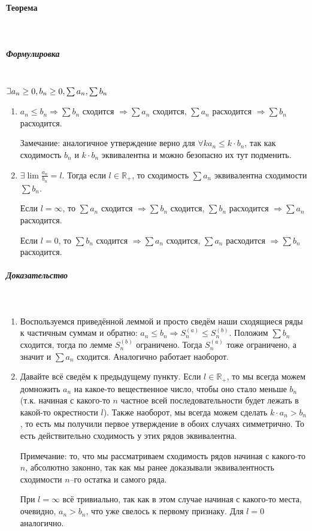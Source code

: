\documentclass{article}
\def\letus{%
\mathord{\setbox0=\hbox{$\exists$}%
         \hbox{\kern 0.125\wd0%
               \vbox to \ht0{%
                  \hrule width 0.75\wd0%
                  \vfill%
                  \hrule width 0.75\wd0}%
               \vrule height \ht0%
               \kern 0.125\wd0}%
       }%
        }
\let\vanillaparagraph\paragraph
\let\vanillasubparagraph\subparagraph
\renewcommand{\paragraph}[1]{\vanillaparagraph{#1}\mbox{}\\}
\renewcommand{\subparagraph}[1]{\vanillasubparagraph{#1}\mbox{}\\}
\begin{document}
\paragraph{Теорема}
\subparagraph{Формулировка}
$\letus a_n \ge 0, b_n \ge 0, \sum a_n, \sum b_n$
\begin{enumerate}
    \item $a_n \le b_n \Rightarrow \sum b_n$ сходится $\Rightarrow \sum a_n$ сходится, $\sum a_n$ расходится $\Rightarrow \sum b_n$ расходится. 
    
    Замечание: аналогичное утверждение верно для $\forall k a_n \le k \cdot b_n$, так как сходимость $b_n$ и $k \cdot b_n$ эквивалентна и можно безопасно их тут подменить.
    
    \item $\exists \lim \frac{a_n}{b_n} = l$. Тогда 
    если $l \in \mathbb{R}_+$, то сходимость $\sum a_n$ эквивалентна сходимости $\sum b_n$.

    Если $l = \infty$, то $\sum a_n$ сходится $\Rightarrow \sum b_n$ сходится, $\sum b_n$ расходится $\Rightarrow \sum a_n$ расходится.
    
    Если $l = 0$, то $\sum b_n$ сходится $\Rightarrow \sum a_n$ сходится, $\sum a_n$ расходится $\Rightarrow \sum b_n$ расходится.
\end{enumerate}

\subparagraph{Доказательство}
\begin{enumerate}
    \item Воспользуемся приведённой леммой и просто сведём наши сходящиеся ряды к частичным суммам и обратно:
    $a_n \le b_n \Rightarrow S_n^{(a)} \le S_n^{(b)}$. Положим $\sum b_n$ сходится, тогда по лемме $S_n^{(b)}$ ограничено. Тогда $S_n^{(a)}$ тоже ограничено, а значит и $\sum a_n$ сходится. Аналогично работает наоборот.
    
    \item Давайте всё сведём к предыдущему пункту. Если $l \in \mathbb{R}_+$, то мы всегда можем домножить $a_n$ на какое-то вещественное число, чтобы оно стало меньше $b_n$ (т.к. начиная с какого-то $n$ частное всей последовательности будет лежать в какой-то окрестности $l$). Также наоборот, мы всегда можем сделать $k \cdot a_n > b_n$, то есть мы получили первое утверждение в обоих случаях симметрично. То есть действительно сходимость у этих рядов эквивалентна. 
    
    Примечание: то, что мы рассматриваем сходимость рядов начиная с какого-то $n$, абсолютно законно, так как мы ранее доказывали эквивалентность сходимости $n$--го остатка и самого ряда.
    
    При $l = \infty$ всё тривиально, так как в этом случае начиная с какого-то места, очевидно, $a_n > b_n$, что уже свелось к первому признаку. Для $l = 0$ аналогично.
\end{enumerate}
\end{document}
